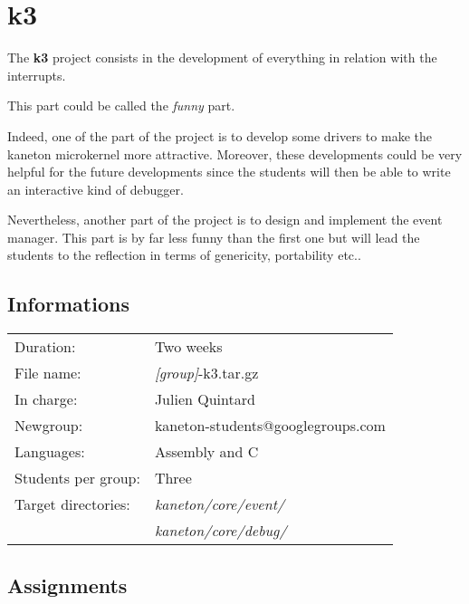 
%
%

\chapter{k3}

The \textbf{k3} project consists in the development of everything in
relation with the interrupts.

This part could be called the \textit{funny} part.

Indeed, one of the part of the project is to develop some drivers to
make the kaneton microkernel more attractive. Moreover, these developments
could be very helpful for the future developments since the students will
then be able to write an interactive kind of debugger.

Nevertheless, another part of the project is to design and implement
the event manager. This part is by far less funny than the first one
but will lead the students to the reflection in terms of genericity,
portability etc..

\newpage

%
%

\section{Informations}

\begin{tabular}{p{7cm}l}
Duration: & Two weeks \\
File name: & \textit{[group]}-k3.tar.gz \\
In charge: & Julien Quintard \\
Newgroup: & kaneton-students@googlegroups.com \\
Languages: & Assembly and C \\
Students per group: & Three \\
Target directories:
  & \textit{kaneton/core/event/} \\
  & \textit{kaneton/core/debug/} \\
\end{tabular}

%
%

\section{Assignments}

